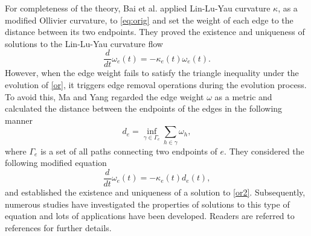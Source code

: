 \documentclass{article}
\begin{document}
For completeness of the theory,
Bai et al. \cite{bailin} applied Lin-Lu-Yau curvature $\kappa$, as a modified Ollivier curvature, to \eqref{eq:orig} and set the weight of each edge to the distance between its two endpoints.
They
proved the existence and uniqueness of solutions to the Lin-Lu-Yau curvature flow
\begin{equation}\label{or}
   \frac{d}{dt}\omega_e(t)=-\kappa_e(t)\omega_e(t).
\end{equation}
However, when the edge weight fails to satisfy the triangle inequality under the evolution of \eqref{or}, it triggers edge removal operations during the evolution process. 
To avoid this, Ma and Yang \cite{MY24} regarded the edge weight $\omega$ as a metric and calculated the distance between the endpoints of the edges in the following manner
\begin{equation}\label{dis}
  d_e=\inf_{\gamma\in \Gamma_{e}}\sum_{h\in \gamma}\omega_h,
\end{equation}
where $\Gamma_{e}$ is a set of all paths connecting two endpoints of  $e$.
They considered the following modified equation
\begin{equation}\label{or2}
\frac{d}{dt}\omega_e(t)=-\kappa_e(t)d_e(t),
\end{equation} 
and established the existence and uniqueness of a solution to \eqref{or2}. Subsequently, numerous studies have investigated the properties of solutions to this type of equation and lots of applications have been developed. Readers are referred to references \cite{BLLL25,MY25,TMYZ25,MYZZ24} for further details.
\end{document}
